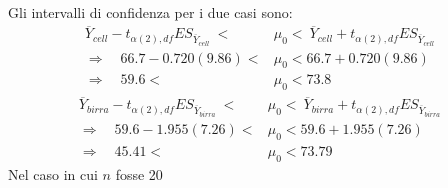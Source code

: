 \documentclass[10pt, draft]{book}
\newcounter{example}[section]
\begin{document}
\begin{example}
    \\
    Gli intervalli di confidenza per i due casi sono:
    \begin{align}
        \overline{Y}_{cell}-t_{\alpha(2),df}ES_{\overline{Y}_{cell}}\ < &\mu_0 <\ \overline{Y}_{cell}+t_{\alpha(2),df}ES_{\overline{Y}_{cell}}
        \\
        \Rightarrow \quad 66.7-0.720(9.86)<&\mu_0<66.7+0.720(9.86)
        \\
        \Rightarrow \quad 59.6<&\mu_0<73.8
    \end{align}
    \begin{align}
        \overline{Y}_{birra}-t_{\alpha(2),df}ES_{\overline{Y}_{birra}}\ < &\mu_0 <\ \overline{Y}_{birra}+t_{\alpha(2),df}ES_{\overline{Y}_{birra}}
        \\
        \Rightarrow \quad 59.6-1.955(7.26)<&\mu_0<59.6+1.955(7.26)
        \\
        \Rightarrow \quad 45.41<&\mu_0<73.79
    \end{align}
    Nel caso in cui $n$ \colorbox{lyellow}{fosse 20}
\end{example}
\end{document}
